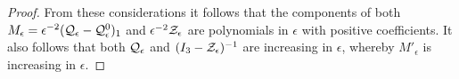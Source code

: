 \begin{proof}
From these considerations it follows that the components of both 
$M_\epsilon = \epsilon^{-2}(\mathcal{Q}_{\epsilon} - \mathcal{Q}_{\epsilon}^0)_1$ and $ \epsilon^{-2}\mathcal{Z}_\epsilon$ are polynomials in $\epsilon$ with positive coefficients. 
It also follows that both $\mathcal{Q}_\epsilon$ and $(I_3-\mathcal{Z}_\epsilon)^{-1}$ are increasing in $\epsilon$, whereby $M'_\epsilon$ is increasing in $\epsilon$.
\end{proof}





